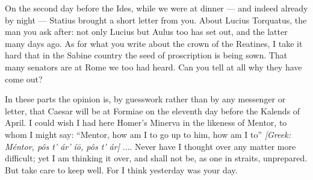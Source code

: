 

 On the second day before the Ides, while we were at dinner --- and indeed already by night --- Statius brought a short letter from you. About Lucius Torquatus, the man you ask after: not only Lucius but Aulus too has set out, and the latter many days ago. As for what you write about the crown of the Reatines, I take it hard that in the Sabine country the seed of proscription is being sown. That many senators are at Rome we too had heard. Can you tell at all why they have come out?

 In these parts the opinion is, by guesswork rather than by any messenger or letter, that Caesar will be at Formiae on the eleventh day before the Kalends of April. I could wish I had here Homer's Minerva in the likeness of Mentor, to whom I might say: ``Mentor, how am I to go up to him, how am I to'' \textit{[Greek: M\'entor, p\^os t' \'ar' \'i\=o, p\^os t' \'ar]} $\ldots$. Never have I thought over any matter more difficult; yet I am thinking it over, and shall not be, as one in straits, unprepared. But take care to keep well. For I think yesterday was your day.
